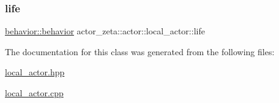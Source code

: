 \mbox{\label{classactor__zeta_1_1actor_1_1local__actor_a301dcbe374e76903da9cb44c368ac587}} 
\subsubsection{\texorpdfstring{life}{life}}
{\footnotesize\ttfamily \hyperlink{classactor__zeta_1_1behavior_1_1behavior}{behavior\+::behavior} actor\+\_\+zeta\+::actor\+::local\+\_\+actor\+::life\hspace{0.3cm}{\ttfamily [protected]}}



The documentation for this class was generated from the following files\+:\begin{DoxyCompactItemize}
\item 
\hyperlink{local__actor_8hpp}{local\+\_\+actor.\+hpp}\item 
\hyperlink{local__actor_8cpp}{local\+\_\+actor.\+cpp}\end{DoxyCompactItemize}
